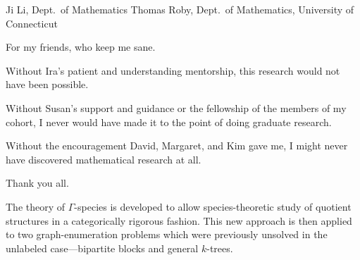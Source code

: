 \documentclass[distribution,draft]{brandiss} %
\numberwithin{section}{chapter}
\numberwithin{figure}{chapter}
\begin{document}

\frontmatter

\makedisstitle

\begin{disssignatures}
  \committeemember Ji Li, Dept.\ of Mathematics
  \committeemember Thomas Roby, Dept.\ of Mathematics, University of Connecticut
\end{disssignatures}

\disscopyright %

\begin{dissdedication}
  For my friends, who keep me sane.
\end{dissdedication}

\begin{dissacknowledgments} %
  Without Ira's patient and understanding mentorship, this research would not have been possible.

  Without Susan's support and guidance or the fellowship of the members of my cohort, I never would have made it to the point of doing graduate research.

  Without the encouragement David, Margaret, and Kim gave me, I might never have discovered mathematical research at all.

  Thank you all.
\end{dissacknowledgments}

\begin{dissabstract}
  The theory of $\Gamma$-species is developed to allow species-theoretic study of quotient structures in a categorically rigorous fashion.
  This new approach is then applied to two graph-enumeration problems which were previously unsolved in the unlabeled case---bipartite blocks and general $k$-trees.
\end{dissabstract}
\end{document}
